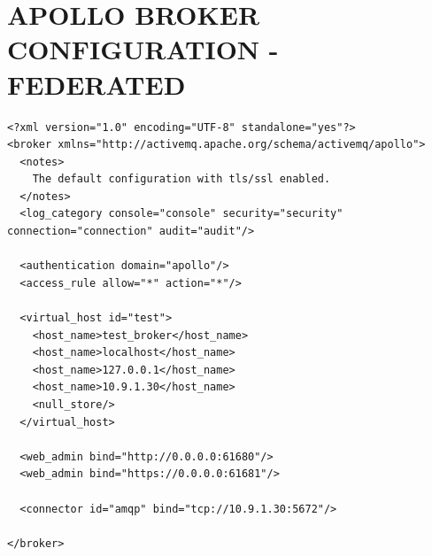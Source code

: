 \documentclass{thesis}
\begin{document}
\chapter{APOLLO BROKER CONFIGURATION - FEDERATED}
\begin{lstlisting}
<?xml version="1.0" encoding="UTF-8" standalone="yes"?>
<broker xmlns="http://activemq.apache.org/schema/activemq/apollo">
  <notes>
    The default configuration with tls/ssl enabled.
  </notes>
  <log_category console="console" security="security" connection="connection" audit="audit"/>

  <authentication domain="apollo"/>
  <access_rule allow="*" action="*"/>

  <virtual_host id="test">
    <host_name>test_broker</host_name>
    <host_name>localhost</host_name>
    <host_name>127.0.0.1</host_name>
    <host_name>10.9.1.30</host_name>
    <null_store/>
  </virtual_host>

  <web_admin bind="http://0.0.0.0:61680"/>
  <web_admin bind="https://0.0.0.0:61681"/>

  <connector id="amqp" bind="tcp://10.9.1.30:5672"/>

</broker>
\end{lstlisting}
\end{document}
